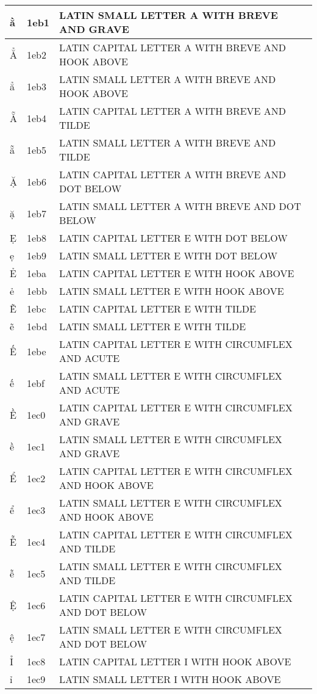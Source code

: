 \documentclass[12pt,letterpaper,openany]{book}
\begin{document}
\begin{center}
\begin{supertabular}{|m{0.25in}|m{0.5in}|m{4in}|}
			ằ & 1eb1 & LATIN SMALL LETTER A WITH BREVE AND GRAVE\\\hline
			Ẳ & 1eb2 & LATIN CAPITAL LETTER A WITH BREVE AND HOOK ABOVE\\\hline
			ẳ & 1eb3 & LATIN SMALL LETTER A WITH BREVE AND HOOK ABOVE\\\hline
			Ẵ & 1eb4 & LATIN CAPITAL LETTER A WITH BREVE AND TILDE\\\hline
			ẵ & 1eb5 & LATIN SMALL LETTER A WITH BREVE AND TILDE\\\hline
			Ặ & 1eb6 & LATIN CAPITAL LETTER A WITH BREVE AND DOT BELOW\\\hline
			ặ & 1eb7 & LATIN SMALL LETTER A WITH BREVE AND DOT BELOW\\\hline
			Ẹ & 1eb8 & LATIN CAPITAL LETTER E WITH DOT BELOW\\\hline
			ẹ & 1eb9 & LATIN SMALL LETTER E WITH DOT BELOW\\\hline
			Ẻ & 1eba & LATIN CAPITAL LETTER E WITH HOOK ABOVE\\\hline
			ẻ & 1ebb & LATIN SMALL LETTER E WITH HOOK ABOVE\\\hline
			Ẽ & 1ebc & LATIN CAPITAL LETTER E WITH TILDE\\\hline
			ẽ & 1ebd & LATIN SMALL LETTER E WITH TILDE\\\hline
			Ế & 1ebe & LATIN CAPITAL LETTER E WITH CIRCUMFLEX AND ACUTE\\\hline
			ế & 1ebf & LATIN SMALL LETTER E WITH CIRCUMFLEX AND ACUTE\\\hline
			Ề & 1ec0 & LATIN CAPITAL LETTER E WITH CIRCUMFLEX AND GRAVE\\\hline
			ề & 1ec1 & LATIN SMALL LETTER E WITH CIRCUMFLEX AND GRAVE\\\hline
			Ể & 1ec2 & LATIN CAPITAL LETTER E WITH CIRCUMFLEX AND HOOK ABOVE\\\hline
			ể & 1ec3 & LATIN SMALL LETTER E WITH CIRCUMFLEX AND HOOK ABOVE\\\hline
			Ễ & 1ec4 & LATIN CAPITAL LETTER E WITH CIRCUMFLEX AND TILDE\\\hline
			ễ & 1ec5 & LATIN SMALL LETTER E WITH CIRCUMFLEX AND TILDE\\\hline
			Ệ & 1ec6 & LATIN CAPITAL LETTER E WITH CIRCUMFLEX AND DOT BELOW\\\hline
			ệ & 1ec7 & LATIN SMALL LETTER E WITH CIRCUMFLEX AND DOT BELOW\\\hline
			Ỉ & 1ec8 & LATIN CAPITAL LETTER I WITH HOOK ABOVE\\\hline
			ỉ & 1ec9 & LATIN SMALL LETTER I WITH HOOK ABOVE\\\hline

\end{supertabular}
\end{center}
\end{document}
